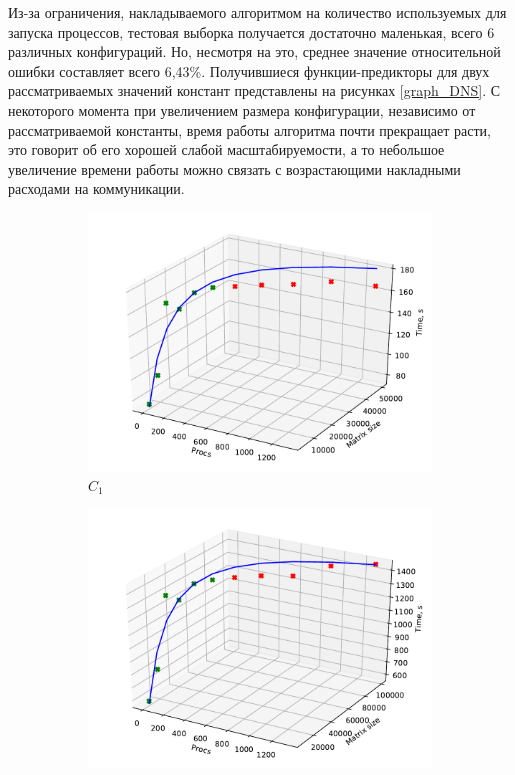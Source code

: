 			Из-за ограничения, накладываемого алгоритмом на количество используемых для запуска процессов, тестовая выборка получается достаточно маленькая, всего 6 различных конфигураций. Но, несмотря на это, среднее значение относительной ошибки составляет всего 6,43\%. Получившиеся функции-предикторы для двух рассматриваемых значений констант представлены на рисунках \eqref{graph_DNS}. С некоторого момента при увеличением размера конфигурации, независимо от рассматриваемой константы, время работы алгоритма почти прекращает расти, это говорит об его хорошей слабой масштабируемости, а то небольшое увеличение времени работы можно связать с возрастающими накладными расходами на коммуникации.

			\begin{figure}
			\centering
			\begin{subfigure}{.5\textwidth}
				\centering
				\includegraphics[width=\linewidth]{./images/graph_C_1_DNS}
				\caption{\(C_1\)}
				\label{graph_C_1_DNS}
			\end{subfigure}
			\begin{subfigure}{.5\textwidth}
				\centering
				\includegraphics[width=\linewidth]{./images/graph_C_2_DNS}

\end{subfigure}
\end{figure}
